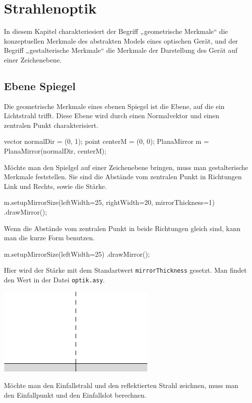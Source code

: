 \chapter{Strahlenoptik}

In diesem Kapitel charakteriesiert der Begriff „geometrische Merkmale“ die konzeptuellen Merkmale des abstrakten Models eines optischen Gerät,
und der Begriff „gestalterische Merkmale“ die Merkmale der Darstellung des Gerät auf einer Zeichenebene.

\section{Ebene Spiegel}

Die geometrische Merkmale eines ebenen Spiegel ist die Ebene, auf die ein Lichtstrahl trifft.
Diese Ebene wird durch einen Normalvektor und einen zentralen Punkt charakterisiert.

\begin{asycode}
vector normalDir = (0, 1);
point centerM = (0, 0);
PlanaMirror m = PlanaMirror(normalDir, centerM);
\end{asycode}

Möchte man den Spielgel auf einer Zeichenebene bringen, muss man gestalterische Merkmale feststellen.
Sie sind die Abstände vom zentralen Punkt in Richtungen Link und Rechts, sowie die Stärke.

\begin{asycode}
m.setupMirrorSize(leftWidth=25, rightWidth=20, mirrorThickness=1)
 .drawMirror();
\end{asycode}

Wenn die Abstände vom zentralen Punkt in beide Richtungen gleich sind, kann man die kurze Form benutzen.

\begin{asycode}
m.setupMirrorSize(leftWidth=25)
 .drawMirror();
\end{asycode}

Hier wird der Stärke mit dem Standartwert \texttt{mirrorThickness} gesetzt.
Man findet den Wert in der Datei \texttt{optik.asy}.

\includegraphics{asy/blankmirror.pdf}



Möchte man den Einfallstrahl und den reflektierten Strahl zeichnen, muss man den Einfallpunkt und den Einfallslot berechnen.